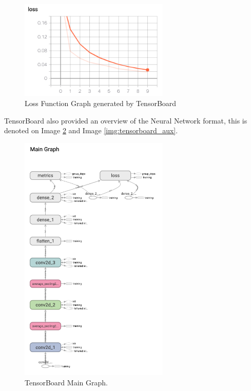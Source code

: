 \documentclass[journal]{IEEEtran}
\begin{document}
\begin{figure}
  \begin{center}
  \includegraphics[width=2.8in]{./../code/tensorboard/tensor_board_loss_graph.png}
  \caption{Loss Function Graph generated by TensorBoard}
  \label{img:loss_func}
  \end{center}
\end{figure}

TensorBoard also provided an overview of the Neural Network format, this is denoted on Image \ref{img:tensorboard_main} and Image \ref{img:tensorboard_aux}.

\begin{figure}
  \begin{center}
  \includegraphics[width=2.8in]{./../code/tensorboard/tensor_board_main_graph.png}
  \caption{TensorBoard Main Graph.}
  \label{img:tensorboard_main}
  \end{center}
\end{figure}
\end{document}
